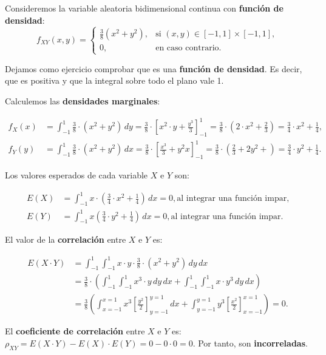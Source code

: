 \documentclass[]{book}
\begin{document}
Consideremos la variable aleatoria bidimensional continua con \textbf{función de densidad}:
\[
f_{XY}(x,y)=\begin{cases}
\frac{3}{8}(x^2+y^2), & \mbox{si }(x,y)\in [-1,1]\times [-1,1],\\
0, & \mbox{en caso contrario.}
\end{cases}
\]

Dejamos como ejercicio comprobar que es una \textbf{función de densidad}. Es decir, que es positiva y que la integral sobre todo el plano vale 1.

Calculemos las \textbf{densidades marginales}:

\[
\begin{array}{rl}
f_X(x) & = \int_{-1}^{1} \frac{3}{8}\cdot (x^2+y^2)\, dy = \frac{3}{8}\cdot\left[x^2\cdot y+\frac{y^3}{3}\right]_{-1}^1 =\frac{3}{8}\cdot\left(2 \cdot x^2+\frac{2}{3}\right)=\frac{3}{4}
\cdot x^2+\frac{1}{4}, \\
f_Y(y) & = \int_{-1}^{1} \frac{3}{8}\cdot(x^2+y^2)\, dx = \frac{3}{8}\cdot\left[\frac{x^3}{3}+y^2 x\right]_{-1}^1 =\frac{3}{8}\cdot\left(\frac{2}{3}+2 y^2+\right)=\frac{3}{4}\cdot y^2+\frac{1}{4}.
\end{array}
\]

Los valores esperados de cada variable \(X\) e \(Y\) son:

\[
\begin{array}{rl}
E(X) & =\int_{-1}^1 x \cdot\left(\frac{3}{4} \cdot x^2+\frac{1}{4}\right)\, dx =0, \mbox{al integrar una función impar,}\\
E(Y) & =\int_{-1}^1 x \left(\frac{3}{4}\cdot y^2+\frac{1}{4}\right)\, dx =0, \mbox{al integrar una función impar.}
\end{array}
\]

El valor de la \textbf{correlación} entre \(X\) e \(Y\) es:

\[
\begin{array}{rl}
E(X\cdot Y) & =\int_{-1}^1\int_{-1}^1 x \cdot y \cdot \frac{3}{8}\cdot (x^2+y^2)\, dy\, dx\\ & =\frac{3}{8}\cdot\left(\int_{-1}^1\int_{-1}^1 x^3 \cdot y\, dy \, dx+\int_{-1}^1\int_{-1}^1 x\cdot y^3\, dy \, dx\right) \\ & = \frac{3}{8} \left(\int_{x=-1}^{x=1}x^3 \left[\frac{y^2}{2}\right]_{y=-1}^{y=1}\, dx + \int_{y=-1}^{y=1}y^3 \left[\frac{x^2}{2}\right]_{x=-1}^{x=1}\right)=0.
\end{array}
\]

El \textbf{coeficiente de correlación} entre \(X\) e \(Y\) es: \(\rho_{XY}=E(X\cdot Y)-E(X)\cdot E(Y)=0-0\cdot 0=0\). Por tanto, son \textbf{incorreladas}.
\end{document}
